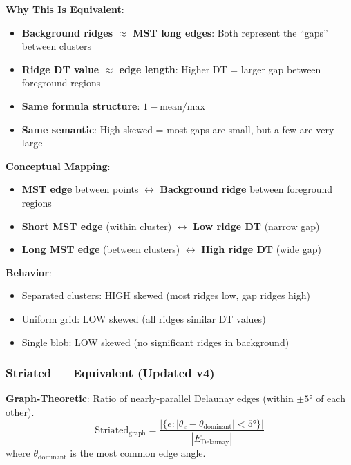\documentclass[11pt]{article}
\begin{document}
\textbf{Why This Is Equivalent}:
\begin{itemize}
    \item \textbf{Background ridges $\approx$ MST long edges}: Both represent the ``gaps'' between clusters
    \item \textbf{Ridge DT value $\approx$ edge length}: Higher DT = larger gap between foreground regions
    \item \textbf{Same formula structure}: $1 - \text{mean}/\text{max}$
    \item \textbf{Same semantic}: High skewed = most gaps are small, but a few are very large
\end{itemize}

\textbf{Conceptual Mapping}:
\begin{itemize}
    \item \textbf{MST edge} between points $\leftrightarrow$ \textbf{Background ridge} between foreground regions
    \item \textbf{Short MST edge} (within cluster) $\leftrightarrow$ \textbf{Low ridge DT} (narrow gap)
    \item \textbf{Long MST edge} (between clusters) $\leftrightarrow$ \textbf{High ridge DT} (wide gap)
\end{itemize}

\textbf{Behavior}:
\begin{itemize}
    \item Separated clusters: HIGH skewed (most ridges low, gap ridges high)
    \item Uniform grid: LOW skewed (all ridges similar DT values)
    \item Single blob: LOW skewed (no significant ridges in background)
\end{itemize}

\subsubsection{Striated — \textcolor{equivalent}{Equivalent} (Updated v4)}

\textbf{Graph-Theoretic}: Ratio of nearly-parallel Delaunay edges (within $\pm 5°$ of each other).
\begin{equation}
    \text{Striated}_{\text{graph}} = \frac{|\{e : |\theta_e - \theta_{\text{dominant}}| < 5°\}|}{|E_{\text{Delaunay}}|}
\end{equation}
where $\theta_{\text{dominant}}$ is the most common edge angle.
\end{document}
